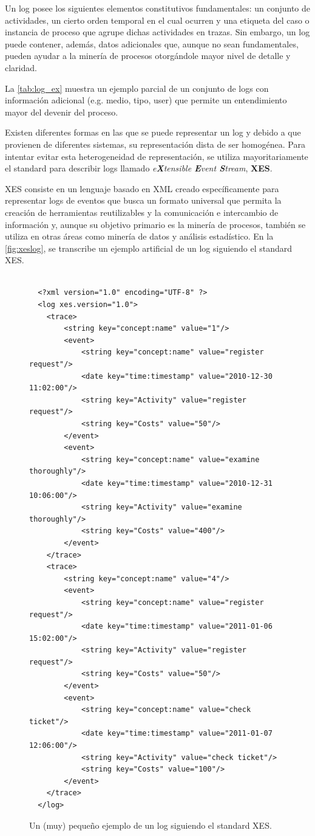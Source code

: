 Un log posee los siguientes elementos constitutivos fundamentales: un conjunto de actividades,
un cierto orden temporal en el cual ocurren y una etiqueta del  caso o instancia de proceso
que agrupe dichas actividades en trazas.
Sin embargo, un log puede contener, además, datos adicionales que, aunque no sean fundamentales, pueden
ayudar a la minería de procesos otorgándole mayor nivel de detalle y claridad.

La \autoref{tab:log_ex} muestra un ejemplo parcial de un conjunto de logs con información 
adicional (e.g. medio, tipo, user) que permite un entendimiento mayor del devenir del proceso.



Existen diferentes formas en las que se puede representar un log y debido a que provienen de diferentes
sistemas, su representación dista de ser homogénea. Para intentar evitar esta heterogeneidad de representación,
se utiliza mayoritariamente el standard para describir logs llamado 
\textit{e\textbf{X}tensible \textbf{E}vent \textbf{S}tream}, \textbf{XES}.

XES consiste en un lenguaje basado en XML creado específicamente para representar logs de eventos que busca 
un formato universal que permita la creación de herramientas reutilizables y la comunicación e intercambio de 
información y, aunque su objetivo primario es la minería de procesos, también se 
utiliza en otras áreas como minería de datos y análisis estadístico.
En la \autoref{fig:xeslog}, se transcribe un ejemplo artificial de un log siguiendo el standard XES.

\begin{figure}[h]
    \begin{verbatim}
    
  <?xml version="1.0" encoding="UTF-8" ?>
  <log xes.version="1.0">
  	<trace>
  		<string key="concept:name" value="1"/>
  		<event>
  			<string key="concept:name" value="register request"/>
  			<date key="time:timestamp" value="2010-12-30 11:02:00"/>
  			<string key="Activity" value="register request"/>
  			<string key="Costs" value="50"/>
  		</event>
  		<event>
  			<string key="concept:name" value="examine thoroughly"/>
  			<date key="time:timestamp" value="2010-12-31 10:06:00"/>
  			<string key="Activity" value="examine thoroughly"/>
  			<string key="Costs" value="400"/>
  		</event>
  	</trace>
  	<trace>
  		<string key="concept:name" value="4"/>
  		<event>
  			<string key="concept:name" value="register request"/>
  			<date key="time:timestamp" value="2011-01-06 15:02:00"/>
  			<string key="Activity" value="register request"/>
  			<string key="Costs" value="50"/>
  		</event>
  		<event>
  			<string key="concept:name" value="check ticket"/>
  			<date key="time:timestamp" value="2011-01-07 12:06:00"/>
  			<string key="Activity" value="check ticket"/>
  			<string key="Costs" value="100"/>
  		</event>
  	</trace>
  </log>
    \end{verbatim}
    \caption{Un (muy) pequeño ejemplo de un log siguiendo el standard XES.}
    \label{fig:xeslog}
\end{figure}

